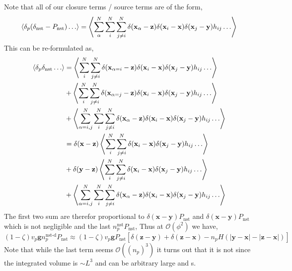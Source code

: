 Note that all of our closure terms / source terms are of the form, 
\begin{equation}
    \left<\delta_p (\delta_\text{nst} - P_\text{nst}) \ldots\right>
    = \left<
        \sum_\alpha^N 
        \sum_i^N 
        \sum_{j\neq i}^N
        \delta(\textbf{x}_\alpha - \textbf{z})
        \delta(\textbf{x}_i - \textbf{x})
        \delta(\textbf{x}_j - \textbf{y}) 
        h_{ij} \ldots
    \right>
\end{equation}
This can be re-formulated as, 
\begin{align*}
    \left<\delta_p \delta_\text{nst} \ldots\right>
    &= 
    \left<
        \sum_i^N 
        \sum_{j\neq i}^N
        \delta(\textbf{x}_{\alpha = i } - \textbf{z})
        \delta(\textbf{x}_i - \textbf{x})
        \delta(\textbf{x}_j - \textbf{y}) 
        h_{ij} \ldots
    \right> \\
    &+ 
    \left<
        \sum_i^N 
        \sum_{j\neq i}^N
        \delta(\textbf{x}_{\alpha = j} - \textbf{z})
        \delta(\textbf{x}_i - \textbf{x})
        \delta(\textbf{x}_j - \textbf{y}) 
        h_{ij} \ldots
    \right> \\
    &+ 
    \left<
        \sum_{\alpha=i,j}^N 
        \sum_i^N 
        \sum_{j\neq i}^N
        \delta(\textbf{x}_\alpha - \textbf{z})
        \delta(\textbf{x}_i - \textbf{x})
        \delta(\textbf{x}_j - \textbf{y}) 
        h_{ij} \ldots
    \right> \\
    &= 
    \delta(\textbf{x} - \textbf{z})
    \left<
        \sum_i^N 
        \sum_{j\neq i}^N
        \delta(\textbf{x}_i - \textbf{x})
        \delta(\textbf{x}_j - \textbf{y}) 
        h_{ij} \ldots
    \right> \\
    &+ 
    \delta(\textbf{y} - \textbf{z})
    \left<
        \sum_i^N 
        \sum_{j\neq i}^N
        \delta(\textbf{x}_i - \textbf{x})
        \delta(\textbf{x}_j - \textbf{y}) 
        h_{ij} \ldots
    \right> 
    \\
    &+ 
    \left<
        \sum_{\alpha=i,j}^N 
        \sum_i^N 
        \sum_{j\neq i}^N
        \delta(\textbf{x}_\alpha - \textbf{z})
        \delta(\textbf{x}_i - \textbf{x})
        \delta(\textbf{x}_j - \textbf{y}) 
        h_{ij} \ldots
    \right> \\
\end{align*}
The first two sum are therefor proportional to $\delta(\textbf{x} - \textbf{y})P_\text{nst}$ and $\delta(\textbf{x} - \textbf{y})P_\text{nst}$ which is not negligible and the last $n_p^\text{nst}P_\text{nst}$,
Thus at $\mathcal{O}(\phi^2)$ we have, 
\begin{equation}
    \left(1-\zeta\right)  v_p \textbf{g} n_p^\text{nst-d} P_\text{nst}
    \approx 
    \left(1-\zeta\right)  v_p \textbf{g} P_\text{nst} [\delta(\textbf{z} - \textbf{y}) + \delta(\textbf{z} - \textbf{x}) - n_p H(|\textbf{y} - \textbf{x}| - |\textbf{z} - \textbf{x}|)]  
\end{equation}
Note that while the last term seems $\mathcal{O}((n_p)^3)$ it turns out that it is not since the integrated volume is $\sim L^3$ and can be arbitrary large and s. 

